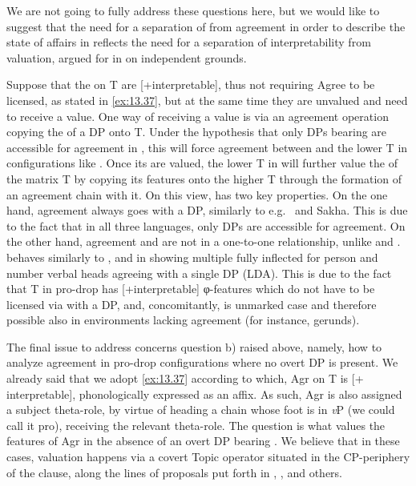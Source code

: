 \documentclass[output=paper]{langsci/langscibook}
\begin{document}
\begin{exe}
We are not going to fully address these questions here, but we would like to
suggest that the need for a separation of  from agreement in order
to describe the state of affairs in  reflects the need for a
separation of interpretability from valuation, argued for in
\citet{PesetskyTorrego2007} on independent grounds.

Suppose that the  on T are [+interpretable], thus not requiring
Agree to be licensed, as stated in \eqref{ex:13.37}, but at the same time
they are unvalued and need to receive a value. One way of receiving a value is
via an agreement operation copying the  of a DP onto T. Under the
hypothesis that only DPs bearing \Nom{} are accessible for agreement in ,
this will force agreement between \Nom{} and the lower T in configurations like
. Once its  are valued, the lower T in 
will further value the  of the matrix T by copying its features
onto the higher T through the formation of an agreement chain with it. On this
view,  has two key properties. On the one hand, agreement always goes with
a \Nom{} DP, similarly to e.g.\  and Sakha. This is due to the
fact that in all three languages, only \Nom{} DPs are accessible for agreement.
On the other hand, agreement and \Nom{} are not in a one-to-one relationship,
unlike  and .  behaves similarly to
,  and  in showing multiple fully inflected
for person and number verbal heads agreeing with a single \Nom{} DP
(\gls{LDA}). This is due to the fact that T in pro-drop
 has [+interpretable] φ-features which do not have to be licensed
via  with a \Nom{} DP, and, concomitantly, \Nom{} is unmarked case
and therefore possible also in environments lacking agreement (for instance,
gerunds).

The final issue to address concerns question b) raised above, namely, how to
analyze agreement in pro-drop configurations where no overt DP is present. We
already said that we adopt \eqref{ex:13.37} according to which, Agr on T is
[+ interpretable], phonologically expressed as an affix. As such, Agr is also
assigned a subject theta-role, by virtue of heading a chain whose foot is in
\emph{v}P (we could call it pro), receiving the relevant theta-role. The
question is what values the features of Agr in the absence of an overt DP
bearing \Nom{}. We believe that in these cases, valuation happens via a covert
Topic operator situated in the CP-periphery of the clause, along the lines of
proposals put forth in \citet{Frascarelli2007}, \citet{FraHin2007},
\citet{Miyagawa2017} and others.


\end{exe}
\end{document}
